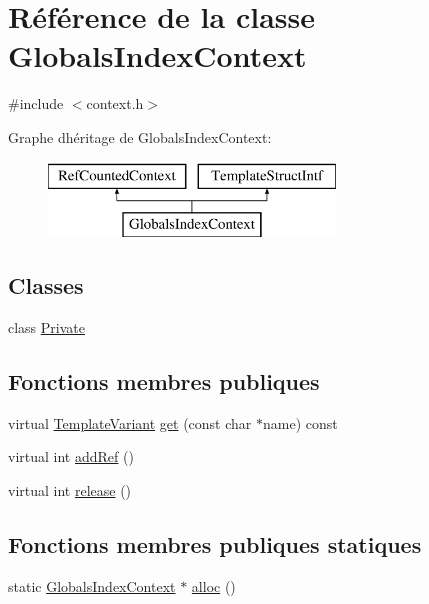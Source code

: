 \hypertarget{class_globals_index_context}{}\section{Référence de la classe Globals\+Index\+Context}
\label{class_globals_index_context}


{\ttfamily \#include $<$context.\+h$>$}

Graphe d\textquotesingle{}héritage de Globals\+Index\+Context\+:\begin{figure}[H]
\begin{center}
\leavevmode
\includegraphics[height=2.000000cm]{class_globals_index_context}
\end{center}
\end{figure}
\subsection*{Classes}
\begin{DoxyCompactItemize}
\item 
class \hyperlink{class_globals_index_context_1_1_private}{Private}
\end{DoxyCompactItemize}
\subsection*{Fonctions membres publiques}
\begin{DoxyCompactItemize}
\item 
virtual \hyperlink{class_template_variant}{Template\+Variant} \hyperlink{class_globals_index_context_ab744b01557222dee259e4b7ce2d3da0b}{get} (const char $\ast$name) const 
\item 
virtual int \hyperlink{class_globals_index_context_a90f2b7d7fd5fab2f29660ebcc1f99db4}{add\+Ref} ()
\item 
virtual int \hyperlink{class_globals_index_context_a65ba296c4327f8628017e4a1073237e3}{release} ()
\end{DoxyCompactItemize}
\subsection*{Fonctions membres publiques statiques}
\begin{DoxyCompactItemize}
\item 
static \hyperlink{class_globals_index_context}{Globals\+Index\+Context} $\ast$ \hyperlink{class_globals_index_context_a22a5920df2ef08fe0c7403ac14db0254}{alloc} ()
\end{DoxyCompactItemize}


